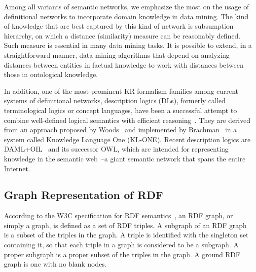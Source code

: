 Among all variants of semantic networks, we emphasize the most on the usage of definitional networks to incorporate domain knowledge in data mining. The kind of knowledge that are best captured by this kind of network is subsumption hierarchy, on which a distance (similarity) measure can be reasonably defined. Such measure is essential in many data mining tasks. It is possible to extend, in a straightforward manner, data mining algorithms that depend on analyzing distances between entities in factual knowledge to work with distances between those in ontological knowledge.

In addition, one of the most prominent KR formalism families among current systems of definitional networks, description logics (DLs), formerly called terminological logics or concept languages, have been a successful attempt to combine well-defined logical semantics with efficient reasoning~\cite{Sowa91principlesof}. They are derived from an approach proposed by Woods~\cite{woods75link} and implemented by Brachman~\cite{Brachman91livingwith} in a system called Knowledge Language One (KL-ONE). %
Recent description logics are DAML+OIL~\cite{Horrocks02daml+oil} and its successor OWL, which are intended for representing knowledge in the semantic web~\cite{Berners-Lee01}--a giant semantic network that spans the entire Internet.

\here

\subsection{Graph Representation of RDF}
\label{sec:rdfgraph}
According to the W3C specification for RDF semantics~\cite{Hayes_rdf2004}, an RDF graph, or simply a graph, is defined as a set of RDF triples. A subgraph of an RDF graph is a subset of the triples in the graph. A triple is identified with the singleton set containing it, so that each triple in a graph is considered to be a subgraph. A proper subgraph is a proper subset of the triples in the graph. A ground RDF graph is one with no blank nodes.

